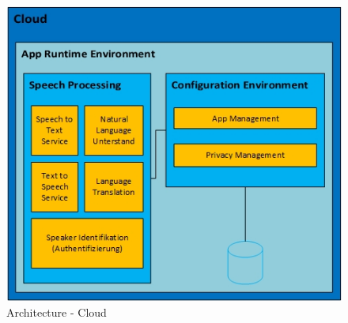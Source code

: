 \begin{figure}[h!]
	\centering
	\includegraphics[width=0.9\linewidth]{Picture/Infrastruktur-Cloud.jpg}
	\caption[Architecture - Cloud]{Architecture - Cloud}
	\label{fig:infrastruktur-cloud}
\end{figure}

